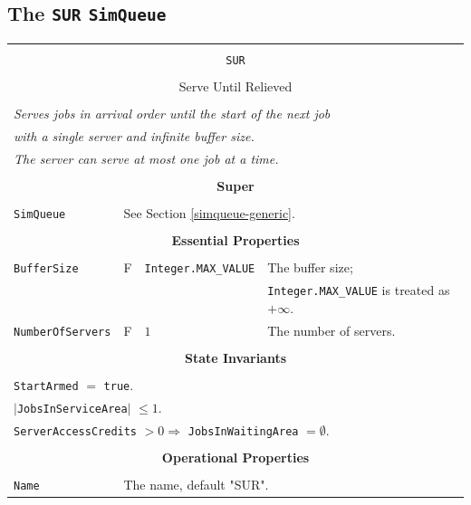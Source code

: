 \documentclass[12pt]{book}
\begin{document}
\subsection{The \lstinline{SUR} \lstinline{SimQueue}}
\label{sec:SUR}

\begin{tabular}{|l|l|l|l|}
\hline
\multicolumn{4}{|c|}{} \\
\multicolumn{4}{|c|}{\lstinline[basicstyle=\large]{SUR}} \\
\multicolumn{4}{|c|}{} \\
\multicolumn{4}{|c|}{Serve Until Relieved} \\
\multicolumn{4}{|c|}{} \\
\hline
\multicolumn{4}{|l|}{\em Serves jobs in arrival order until the start of the next job} \\
\multicolumn{4}{|l|}{\em with a single server and infinite buffer size.} \\
\multicolumn{4}{|l|}{\em The server can serve at most one job at a time.} \\
\hline
\multicolumn{4}{|c|}{} \\
\multicolumn{4}{|c|}{\bf Super} \\
\multicolumn{4}{|c|}{} \\
\hline
\lstinline|SimQueue| & \multicolumn{3}{|l|}{See Section \ref{simqueue-generic}.} \\
\hline
\multicolumn{4}{|c|}{} \\
\multicolumn{4}{|c|}{\bf Essential Properties} \\
\multicolumn{4}{|c|}{} \\
\hline
\lstinline|BufferSize|      & F & \lstinline|Integer.MAX_VALUE|
                            & The buffer size; \\
                        & & & \lstinline|Integer.MAX_VALUE| is treated as $+\infty$. \\
\hline
\lstinline|NumberOfServers| & F & $1$
                            & The number of servers. \\
\hline
\multicolumn{4}{|c|}{} \\
\multicolumn{4}{|c|}{\bf State  Invariants} \\
\multicolumn{4}{|c|}{} \\
\hline
\multicolumn{4}{|l|}{\lstinline|StartArmed| $=$ \lstinline|true|.} \\
\multicolumn{4}{|l|}{$|$\lstinline|JobsInServiceArea|$|$ $\leq 1$.} \\
\multicolumn{4}{|l|}{\lstinline|ServerAccessCredits| $> 0 \Rightarrow$ \lstinline|JobsInWaitingArea| $= \emptyset$.} \\
\hline
\multicolumn{4}{|c|}{} \\
\multicolumn{4}{|c|}{\bf Operational Properties} \\
\multicolumn{4}{|c|}{} \\
\hline
\lstinline|Name| & \multicolumn{3}{|l|}{The name, default "SUR".} \\
\hline
\end{tabular}
\end{document}
